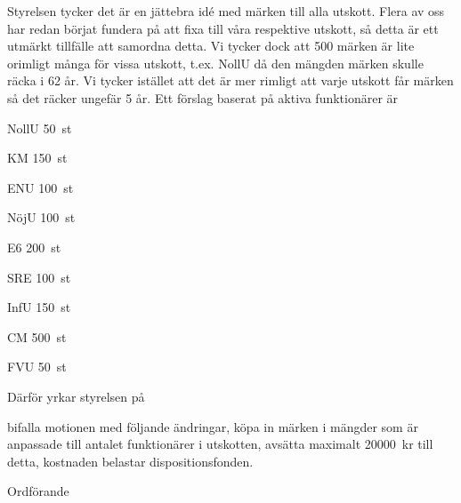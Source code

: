 \documentclass[../_main/handlingar.tex]{subfiles}
\begin{document}
\motionssvar

Styrelsen tycker det är en jättebra idé med märken till alla utskott. Flera av oss har redan börjat fundera på att fixa till våra respektive utskott, så detta är ett utmärkt tillfälle att samordna detta.
Vi tycker dock att 500 märken är lite orimligt många för vissa utskott, t.ex. NollU då den mängden märken skulle räcka i 62 år. Vi tycker istället att det är mer rimligt att varje utskott får märken så det räcker ungefär 5 år. Ett förslag baserat på aktiva funktionärer är

\begin{emptylist}
    \item NollU \SI{50}{st}
    \item KM \SI{150}{st}
    \item ENU \SI{100}{st}
    \item NöjU \SI{100}{st}
    \item E6 \SI{200}{st}
    \item SRE \SI{100}{st}
    \item InfU \SI{150}{st}
    \item CM \SI{500}{st}
    \item FVU \SI{50}{st}
\end{emptylist}

Därför yrkar styrelsen på 

\begin{attsatser}
    \att bifalla motionen med följande ändringar,
    \att köpa in märken i mängder som är anpassade till antalet funktionärer i utskotten,
    \att avsätta maximalt \SI{20 000}{kr} till detta,
    \att kostnaden belastar dispositionsfonden.
\end{attsatser}

\begin{signatures}{1}
    \ist
    \signature{Daniel Bakic}{Ordförande}
\end{signatures}
\end{document}
